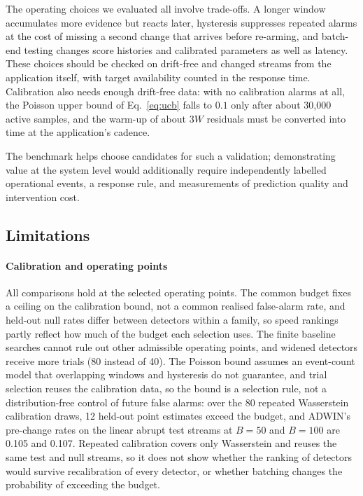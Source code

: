 \documentclass[preprint,12pt]{elsarticle}
\begin{document}
The operating choices we evaluated all involve trade-offs. A longer window accumulates more evidence but reacts later, hysteresis suppresses repeated alarms at the cost of missing a second change that arrives before re-arming, and batch-end testing changes score histories and calibrated parameters as well as latency. These choices should be checked on drift-free and changed streams from the application itself, with target availability counted in the response time. Calibration also needs enough drift-free data: with no calibration alarms at all, the Poisson upper bound of Eq.~\eqref{eq:ucb} falls to $0.1$ only after about 30,000 active samples, and the warm-up of about $3W$ residuals must be converted into time at the application's cadence.

The benchmark helps choose candidates for such a validation; demonstrating value at the system level would additionally require independently labelled operational events, a response rule, and measurements of prediction quality and intervention cost.

\subsection{Limitations}
\label{sec:limitations}
\paragraph{Calibration and operating points} All comparisons hold at the selected operating points. The common budget fixes a ceiling on the calibration bound, not a common realised false-alarm rate, and held-out null rates differ between detectors within a family, so speed rankings partly reflect how much of the budget each selection uses. The finite baseline searches cannot rule out other admissible operating points, and widened detectors receive more trials (80 instead of 40). The Poisson bound assumes an event-count model that overlapping windows and hysteresis do not guarantee, and trial selection reuses the calibration data, so the bound is a selection rule, not a distribution-free control of future false alarms: over the 80 repeated Wasserstein calibration draws, 12 held-out point estimates exceed the budget, and ADWIN's pre-change rates on the linear abrupt test streams at $B=50$ and $B=100$ are 0.105 and 0.107. Repeated calibration covers only Wasserstein and reuses the same test and null streams, so it does not show whether the ranking of detectors would survive recalibration of every detector, or whether batching changes the probability of exceeding the budget.
\end{document}
